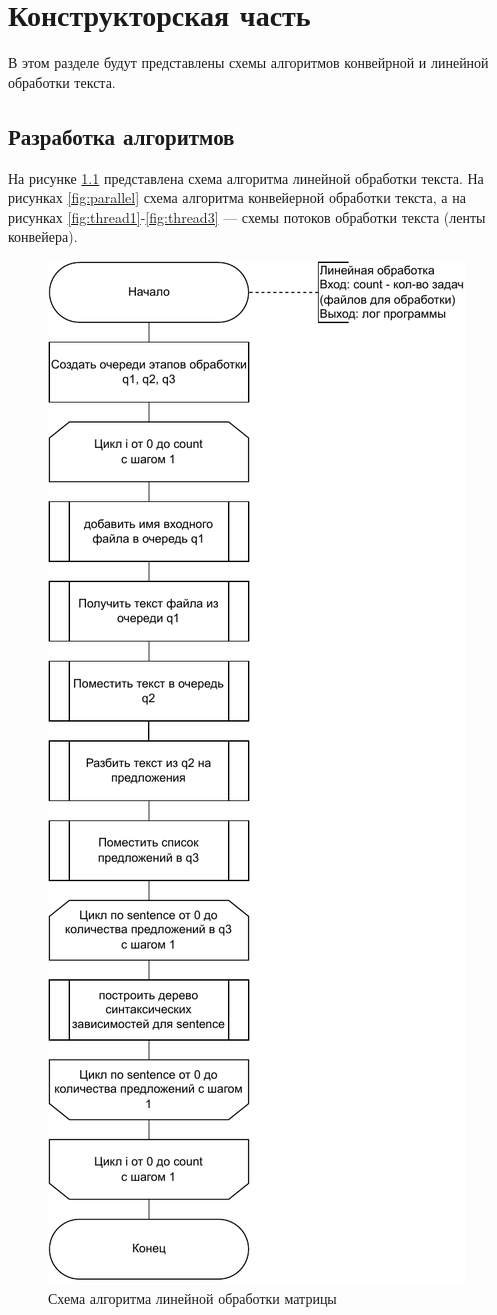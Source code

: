 \chapter{Конструкторская часть}
В этом разделе будут представлены схемы алгоритмов конвейрной и линейной обработки текста.


\section{Разработка алгоритмов}
На рисунке \ref{fig:linear} представлена схема алгоритма линейной обработки текста. 
На рисунках \ref{fig:parallel} схема алгоритма конвейерной обработки текста, а на рисунках \ref{fig:thread1}-\ref{fig:thread3} --- схемы потоков обработки текста (ленты конвейера).

\begin{figure}[h!]
	\centering
	\includegraphics[width=0.6\linewidth]{img/linear}
	\caption{Схема алгоритма линейной обработки матрицы}
	\label{fig:linear}
\end{figure}

